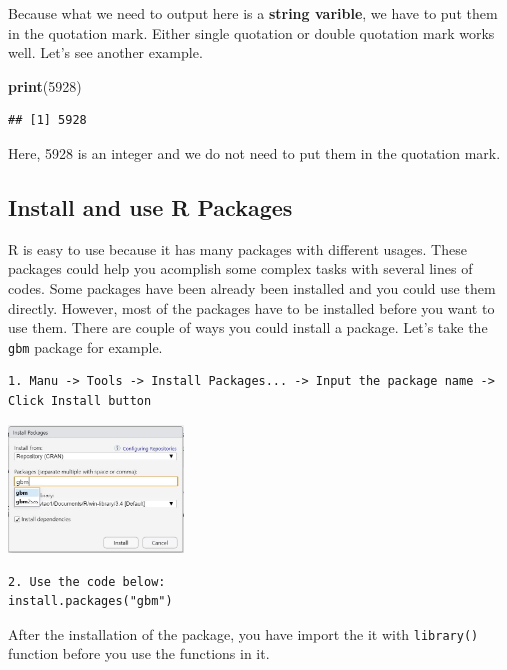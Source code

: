 \documentclass[]{book}
\newenvironment{Shaded}{\begin{snugshade}}{\end{snugshade}}
\newcommand{\DecValTok}[1]{\textcolor[rgb]{0.00,0.00,0.81}{#1}}
\newcommand{\KeywordTok}[1]{\textcolor[rgb]{0.13,0.29,0.53}{\textbf{#1}}}
\newcommand{\NormalTok}[1]{#1}
\begin{document}
Because what we need to output here is a \textbf{string varible}, we have to put them in the quotation mark. Either single quotation or double quotation mark works well. Let's see another example.

\begin{Shaded}
\begin{Highlighting}[]
\KeywordTok{print}\NormalTok{(}\DecValTok{5928}\NormalTok{)}
\end{Highlighting}
\end{Shaded}

\begin{verbatim}
## [1] 5928
\end{verbatim}

Here, 5928 is an integer and we do not need to put them in the quotation mark.

\hypertarget{install-and-use-r-packages}{%
\subsection{Install and use R Packages}\label{install-and-use-r-packages}}

R is easy to use because it has many packages with different usages. These packages could help you acomplish some complex tasks with several lines of codes.
Some packages have been already been installed and you could use them directly. However, most of the packages have to be installed before you want to use them. There are couple of ways you could install a package. Let's take the \texttt{gbm} package for example.

\begin{verbatim}
1. Manu -> Tools -> Install Packages... -> Input the package name -> Click Install button
\end{verbatim}

\includegraphics[width=0.35\textwidth,height=\textheight]{Pics/InstallPackages.JPG}

\begin{verbatim}
2. Use the code below:
install.packages("gbm")
\end{verbatim}

After the installation of the package, you have import the it with \texttt{library()} function before you use the functions in it.
\end{document}
